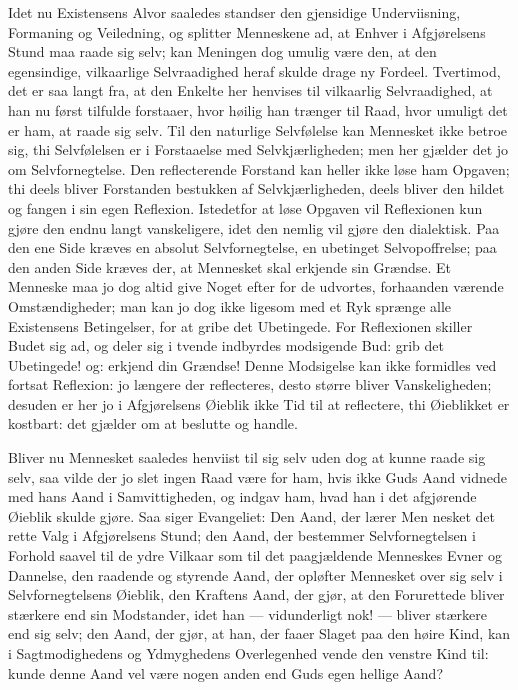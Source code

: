 \documentclass[12pt,a4paper]{book}
\newcommand{\opage}[1]{\marginnote{\footnotesize\textit{[#1]}}}
\begin{document}
Idet nu Existensens Alvor saaledes standser den gjensidige
\opage{76} Underviisning, Formaning og Veiledning, og splitter Menneskene ad, at Enhver
i Afgjørelsens Stund maa raade sig selv; kan Meningen dog umulig være den, at
den egensindige, vilkaarlige Selvraadighed heraf skulde drage ny Fordeel.
Tvertimod, det er saa langt fra, at den Enkelte her henvises til vilkaarlig
Selvraadighed, at han nu først tilfulde forstaaer, hvor høilig han trænger
til Raad, hvor umuligt det er ham, at raade sig selv. Til den naturlige
Selvfølelse kan Mennesket ikke betroe sig, thi Selvfølelsen er i Forstaaelse
med Selvkjærligheden; men her gjælder det jo om Selvfornegtelse. Den
reflecterende Forstand kan heller ikke løse ham Opgaven; thi deels bliver
Forstanden bestukken af Selvkjærligheden, deels bliver den hildet og fangen i
sin egen Reflexion. Istedetfor at løse Opgaven vil Reflexionen kun gjøre den
endnu langt vanskeligere, idet den nemlig vil gjøre den dialektisk. Paa den
ene Side kræves en absolut Selvfornegtelse, en ubetinget Selvopoffrelse; paa
den anden Side kræves der, at Mennesket skal erkjende sin Grændse. Et
Menneske maa jo dog altid give Noget efter for de udvortes, forhaanden
værende Omstændigheder; man kan jo dog ikke ligesom med et Ryk sprænge alle
Existensens Betingelser, for at gribe det Ubetingede. For Reflexionen skiller
Budet sig ad, og deler sig i tvende indbyrdes modsigende Bud: grib det
Ubetingede! og: erkjend din Grændse! Denne Modsigelse kan ikke formidles ved
fortsat Reflexion: jo længere der reflecteres, desto større bliver
Vanskeligheden; desuden er her jo i Afgjørelsens Øieblik ikke Tid til at
reflectere, thi Øieblikket er kostbart: det gjælder om at beslutte og handle.

Bliver nu Mennesket saaledes henviist til sig selv uden dog at kunne raade
sig selv, saa vilde der jo slet ingen Raad være for ham, hvis ikke Guds Aand
vidnede med hans Aand i Samvittigheden, og indgav ham, hvad han i det
afgjørende Øieblik skulde gjøre. Saa siger Evangeliet: Den Aand, der lærer
Men\-%
\opage{77}nesket det rette Valg i Afgjørelsens Stund; den Aand, der bestemmer
Selvfornegtelsen i Forhold saavel til de ydre Vilkaar som til det
paagjældende Menneskes Evner og Dannelse, den raadende og styrende Aand, der
opløfter Mennesket over sig selv i Selvfornegtelsens Øieblik, den Kraftens
Aand, der gjør, at den Forurettede bliver stærkere end sin Modstander, idet
han --- vidunderligt nok! --- bliver stærkere end sig selv; den Aand, der
gjør, at han, der faaer Slaget paa den høire Kind, kan i Sagtmodighedens og
Ydmyghedens Overlegenhed vende den venstre Kind til: kunde denne Aand vel
være nogen anden end Guds egen hellige Aand?
\end{document}
